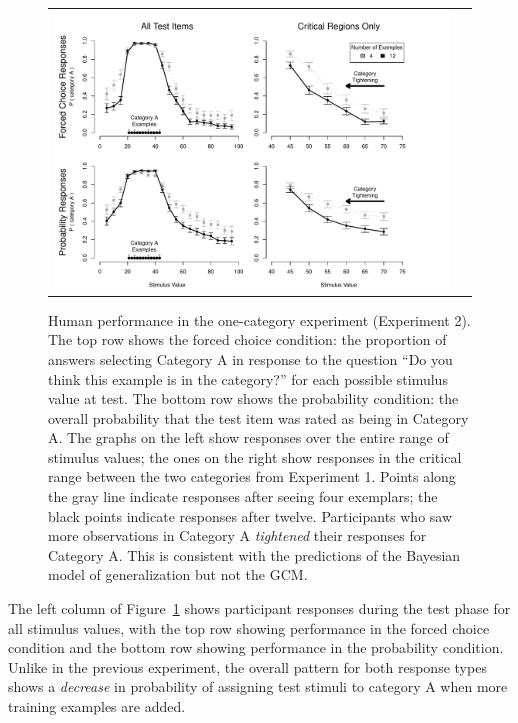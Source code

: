 \documentclass[doc,apacite]{apa6}
\begin{document}
\begin{figure}[t]
\begin{center}
\begin{tabular}{cc}
\includegraphics[width=5in]{figures/one_cat_results.pdf}
\end{tabular}
\end{center}
\caption{{\small  Human performance in the one-category experiment (Experiment 2). The top row shows the {\sc forced choice} condition: the proportion of answers selecting Category A in response to the question ``Do you think this example is in the category?'' for each possible stimulus value at test. The bottom row shows the {\sc probability} condition: the overall probability that the test item was rated as being in Category A. The graphs on the left show responses over the entire range of stimulus values; the ones on the right show responses in the critical range between the two categories from Experiment 1. Points along the gray line indicate responses after seeing {\sc four} exemplars; the black points indicate responses after {\sc twelve}. Participants who saw more observations in Category A {\it tightened} their responses for Category A. This is consistent with the predictions of the Bayesian model of generalization but not the GCM.}}
\label{fig:exp2results}
\end{figure}

The left column of Figure~\ref{fig:exp2results} shows participant responses during the test phase for all stimulus values, with the top row showing performance in the {\sc forced choice} condition and the bottom row showing performance in the {\sc probability} condition. Unlike in the previous experiment, the overall pattern for both response types shows a {\it decrease} in probability of assigning test stimuli to category A when more training examples are added. 
\end{document}
